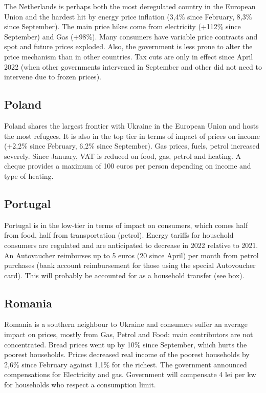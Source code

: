 \documentclass[
  9pt,
  a4paper,
  numbers=noendperiod,
  DIV=12]{scrartcl}
\begin{document}
The Netherlands is perhaps both the most deregulated country in the
European Union and the hardest hit by energy price inflation (3,4\%
since February, 8,3\% since September). The main price hikes come from
electricity (+112\% since September) and Gas (+98\%). Many consumers
have variable price contracts and spot and future prices exploded. Also,
the government is less prone to alter the price mechanism than in other
countries. Tax cuts are only in effect since April 2022 (when other
governments intervened in September and other did not need to intervene
due to frozen prices).

\hypertarget{poland}{%
\subsection{Poland}\label{poland}}

Poland shares the largest frontier with Ukraine in the European Union
and hosts the most refugees. It is also in the top tier in terms of
impact of prices on income (+2,2\% since February, 6,2\% since
September). Gas prices, fuels, petrol increased severely. Since January,
VAT is reduced on food, gas, petrol and heating. A cheque provides a
maximum of 100 euros per person depending on income and type of heating.

\hypertarget{portugal}{%
\subsection{Portugal}\label{portugal}}

Portugal is in the low-tier in terms of impact on consumers, which comes
half from food, half from transportation (petrol). Energy tariffs for
household consumers are regulated and are anticipated to decrease in
2022 relative to 2021. An Autovaucher reimburses up to 5 euros (20 since
April) per month from petrol purchases (bank account reimbursement for
those using the special Autovoucher card). This will probably be
accounted for as a household transfer (see box).

\hypertarget{romania}{%
\subsection{Romania}\label{romania}}

Romania is a southern neighbour to Ukraine and consumers suffer an
average impact on prices, mostly from Gas, Petrol and Food: main
contributors are not concentrated. Bread prices went up by 10\% since
September, which hurts the poorest households. Prices decreased real
income of the poorest households by 2,6\% since February against 1,1\%
for the richest. The government announced compensations for Electricity
and gas. Government will compensate 4 lei per kw for households who
respect a consumption limit.
\end{document}
